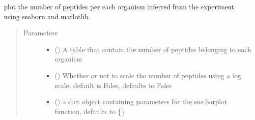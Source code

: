 \documentclass[letterpaper,10pt,english]{sphinxmanual}
\begin{document}
\begin{fulllineitems}
\label{\detokenize{IPTK.Visualization:IPTK.Visualization.vizTools.plot_num_peptides_per_organism}}
plot the number of peptides per each organism inferred from the experiment using seaborn and matlotlib.
\begin{quote}\begin{description}
\item[{Parameters}] \leavevmode\begin{itemize}
\item {} 
 () \textendash{} A table that contain the number of peptides belonging to each organism

\item {} 
 (\sphinxstyleliteralemphasis{\sphinxupquote{, }}) \textendash{} Whether or not to scale the number of peptides using a log scale, default is False, defaults to False

\item {} 
 (\sphinxstyleliteralemphasis{\sphinxupquote{{[}}}\sphinxstyleliteralemphasis{\sphinxupquote{,}}\sphinxstyleliteralemphasis{\sphinxupquote{{]}}}\sphinxstyleliteralemphasis{\sphinxupquote{, }}) \textendash{} a dict object containing parameters for the sns.barplot function, defaults to \{\}


\end{itemize}
\end{description}
\end{quote}
\end{fulllineitems}
\end{document}
